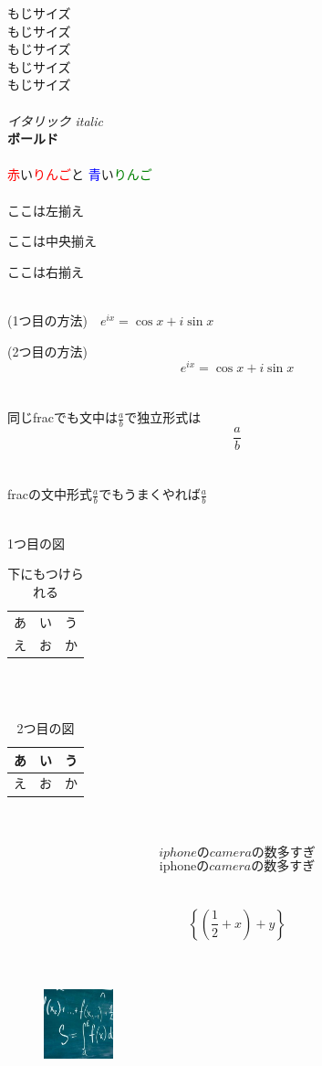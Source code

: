 \documentclass{ltjsarticle}
\begin{document}
\noindent
{\small もじサイズ}\\
もじサイズ\\
{\large もじサイズ}\\
{\Large もじサイズ}\\
{\LARGE もじサイズ}
\\ \\
\noindent
{\it イタリック italic}\\
{\bf ボールド}
\\ \\
\textcolor{red}{赤}い\textcolor{red}{りんご}と
\textcolor{blue}{青}い\textcolor{green}{りんご}
\\ \\
\noindent
ここは左揃え
\begin{center}
ここは中央揃え
\end{center}
\hfill ここは右揃え
\\ \\
\noindent
\begin{center}
(1つ目の方法)　$e^{ix}=\cos x+i\sin x$
\end{center}
(2つ目の方法)　$$e^{ix}=\cos x+i\sin x$$
\\ \\
\noindent
同じfracでも文中は$\frac{a}{b}$で独立形式は$$\frac{a}{b}$$
\\ \\
\noindent
fracの文中形式$\frac{a}{b}$でもうまくやれば$\displaystyle\frac{a}{b}$
\\ \\
\noindent
\begin{table}[htb]
\caption{1つ目の図}
\centering
\begin{tabular}{lll}
    あ & い & う \\
    え & お & か
\end{tabular}
\caption{下にもつけられる}
\end{table}
\\ \\
\noindent 
\begin{table}[htb]
\caption{2つ目の図}
\centering
\begin{tabular}{|l||l|l|} \hline
    あ & い & う \\ \hline
    え & お & か \\ \hline
\end{tabular}
\end{table}
\\ \\
\noindent
$$iphone の camera の数多すぎ$$
$$\mathrm{iphone} の camera の数多すぎ$$
\\ \\
\noindent
$$\left\{ \left( \dfrac{1}{2}+x\right) +y \right\}$$
\\ \\
\noindent
\begin{figure}[htb]
\includegraphics[width=20mm]{hogehoge.jpg}
\end{figure}
\end{document}

